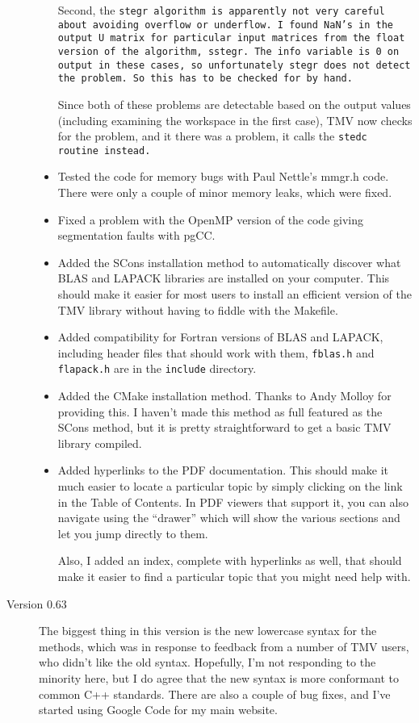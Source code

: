 \begin{description}
\begin{itemize}
Second, the \tt{stegr} algorithm is apparently not very careful about avoiding overflow or underflow.
I found \tt{NaN}'s in the output U matrix for particular input matrices from the float version
of the algorithm, \tt{sstegr}.  The \tt{info} variable is 0 on output in these cases, so unfortunately
\tt{stegr} does not detect the problem.  So this has to be checked for by hand.

Since both of these problems are detectable based on the output values (including examining
the workspace in the first case), TMV now checks for the problem, and it there was a problem,
it calls the \tt{stedc} routine instead.
\item
Tested the code for memory bugs with Paul Nettle's mmgr.h code.  There were only a couple of 
minor memory leaks, which were fixed.
\item
Fixed a problem with the OpenMP version of the code giving segmentation faults with pgCC.
\item
Added the SCons installation method to automatically discover what BLAS and LAPACK libraries 
are installed on your computer.  This should make it easier for most users to install an efficient
version of the TMV library without having to fiddle with the Makefile.
\item
Added compatibility for Fortran versions of BLAS and LAPACK, including header files that
should work with them, \texttt{fblas.h} and \texttt{flapack.h} are in the \texttt{include} directory.
\item
Added the CMake installation method.  Thanks to Andy Molloy for providing this.  I haven't
made this method as full featured as the SCons method, but it is pretty straightforward to get
a basic TMV library compiled.
\item
Added hyperlinks to the PDF documentation.  This should make it much easier to locate a particular topic by simply clicking on the link in the Table of Contents.  In PDF viewers that support it, you can 
also navigate using the ``drawer'' which will show the various sections and let you jump directly to them.

Also, I added an index, complete with hyperlinks as well, that should make it easier to find a particular topic that you might need help with.

\end{itemize}

\item[Version 0.63]
The biggest thing in this version is the new lowercase syntax for the
methods, which was in response to feedback from a number of TMV users, 
who didn't like the old syntax.  Hopefully, I'm not responding to the 
minority here, but I do agree that the new syntax is more conformant 
to common C++ standards.  There are also a couple of bug fixes, and I've
started using Google Code for my main website.


\end{description}
